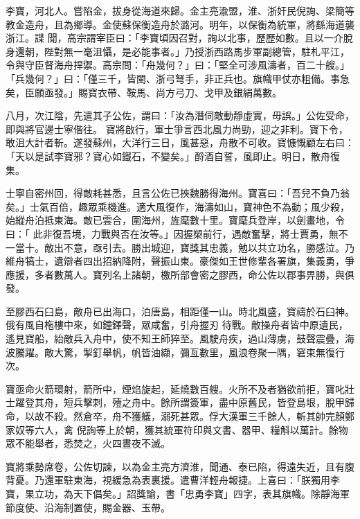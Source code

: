 \begin{pinyinscope}
 李寶，河北人。嘗陷金，拔身從海道來歸。金主亮渝盟，淮、浙奸民倪詢、梁簡等教金造舟，且為鄉導。金使蘇保衡造舟於潞河。明年，以保衡為統軍，將繇海道襲浙江。諜
 聞，高宗謂宰臣曰：「李寶頃因召對，詢以北事，歷歷如數。且以一介脫身還朝，陛對無一毫沮懾，是必能事者。」乃授浙西路馬步軍副總管，駐札平江，令與守臣督海舟捍禦。高宗問：「舟幾何？」曰：「堅全可涉風濤者，百二十艘。」「兵幾何？」曰：「僅三千，皆閩、浙弓弩手，非正兵也。旗幟甲仗亦粗備。事急矣，臣願亟發。」賜寶衣帶、鞍馬、尚方弓刀、戈甲及銀絹萬數。



 八月，次江陰，先遣其子公佐，謂曰：「汝為潛伺敵動靜虛實，毋誤。」公佐受命，即與將官邊士寧偕往。
 寶將啟行，軍士爭言西北風力尚勁，迎之非利。寶下令，敢沮大計者斬。遂發蘇州，大洋行三日，風甚惡，舟散不可收。寶慷慨顧左右曰：「天以是試李寶邪？寶心如鐵石，不變矣。」酹酒自誓，風即止。明日，散舟復集。



 士寧自密州回，得敵耗甚悉，且言公佐已挾魏勝得海州。寶喜曰：「吾兒不負乃翁矣。」士氣百倍，趣眾乘機進。適大風復作，海濤如山，寶神色不為動；風少殺，始縱舟泊抵東海。敵已雲合，圍海州，旌麾數十里。寶麾兵登岸，以劍畫地，令曰：「
 此非復吾境，力戰與否在汝等。」因握槊前行，遇敵奮擊，將士賈勇，無不一當十。敵出不意，亟引去。勝出城迎，寶獎其忠義，勉以共立功名，勝感泣。乃維舟犒士，遺辯者四出招納降附，聲振山東。豪傑如王世修輩各署旗，集義勇，爭應援，多者數萬人。寶列名上諸朝，檄所部會密之膠西，命公佐以郡事畀勝，與俱發。



 至膠西石臼島，敵舟已出海口，泊唐島，相距僅一山。時北風盛，寶禱於石臼神。俄有風自柂樓中來，如鐘鐸聲，眾咸奮，引舟握刃
 待戰。敵操舟者皆中原遺民，遙見寶船，紿敵兵入舟中，使不知王師猝至。風駛舟疾，過山薄虜，鼓聲震疊，海波騰躍。敵大驚，掣釘舉帆，帆皆油纈，彌亙數里，風浪卷聚一隅，窘束無復行次。



 寶亟命火箭環射，箭所中，煙焰旋起，延燒數百艘。火所不及者猶欲前拒，寶叱壯士躍登其舟，短兵擊刺，殪之舟中。餘所謂簽軍，盡中原舊民，皆登島垠，脫甲歸命，以故不殺。然倉卒，舟不獲艤，溺死甚眾。俘大漢軍三千餘人，斬其帥完顏鄭家奴等六人，禽
 倪詢等上於朝，獲其統軍符印與文書、器甲、糧斛以萬計。餘物眾不能舉者，悉焚之，火四晝夜不滅。



 寶將乘勢席卷，公佐切諫，以為金主亮方濟淮，聞通、泰已陷，得遠失近，且有腹背憂。乃還軍駐東海，視緩急為表裏援。遣曹洋輕舟報捷。上喜曰：「朕獨用李寶，果立功，為天下倡矣。」詔獎諭，書「忠勇李寶」四字，表其旗幟。除靜海軍節度使、沿海制置使，賜金器、玉帶。




\end{pinyinscope}
